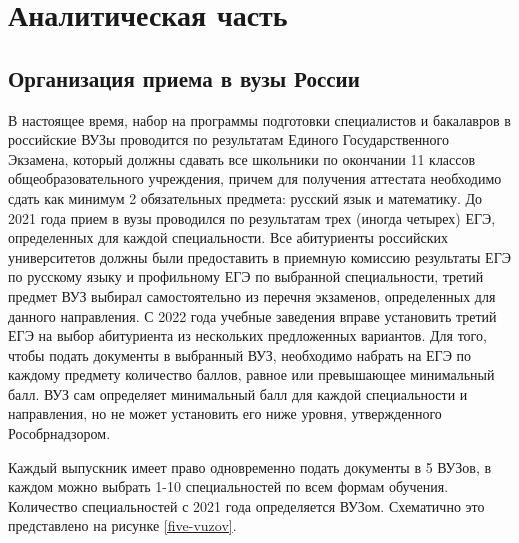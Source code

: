 \section{Аналитическая часть}

\subsection{Организация приема в вузы России}

В настоящее время, набор на программы подготовки специалистов и бакалавров в российские ВУЗы проводится по результатам Единого Государственного Экзамена\cite{ege}, который должны сдавать все школьники по окончании 11 классов общеобразовательного учреждения, причем для получения аттестата необходимо сдать как минимум 2 обязательных предмета: русский язык и математику. До 2021 года прием в вузы проводился по результатам трех (иногда четырех) ЕГЭ, определенных для каждой специальности. Все абитуриенты российских университетов должны были предоставить в приемную комиссию результаты ЕГЭ по русскому языку и профильному ЕГЭ по выбранной специальности, третий предмет ВУЗ выбирал самостоятельно из перечня экзаменов, определенных для данного направления. С 2022 года учебные заведения вправе установить третий ЕГЭ на выбор абитуриента из нескольких предложенных вариантов. Для того, чтобы подать документы в выбранный ВУЗ, необходимо набрать на ЕГЭ по каждому предмету количество баллов, равное или превышающее минимальный балл. ВУЗ сам определяет минимальный балл для каждой специальности и направления, но не может установить его ниже уровня, утвержденного Рособрнадзором\cite{prikaz}.

Каждый выпускник имеет право одновременно подать документы в 5 ВУЗов, в каждом можно выбрать 1-10 специальностей по всем формам обучения. Количество специальностей с 2021 года определяется ВУЗом. Схематично это представлено на рисунке \ref{five-vuzov}.

